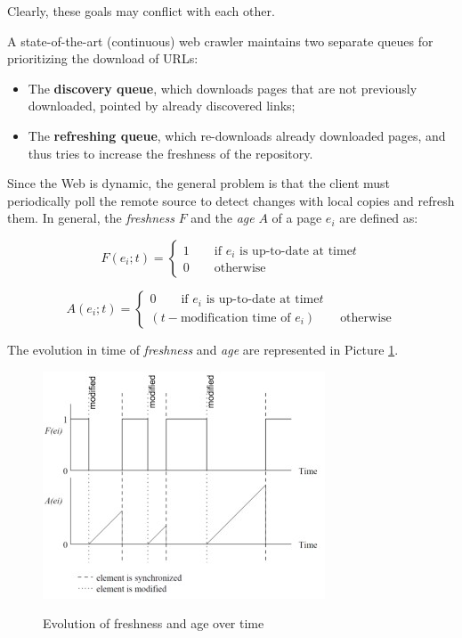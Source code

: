 Clearly, these goals may conflict with each other. 

A state-of-the-art (continuous) web crawler maintains two separate queues for prioritizing the download of URLs:

\begin{itemize}
    \item The \textbf{discovery queue}, which downloads pages that are not previously downloaded, pointed by already discovered links;
    \item The \textbf{refreshing queue}, which re-downloads already downloaded pages, and thus tries to increase the freshness of the repository.
\end{itemize}

Since the Web is dynamic, the general problem is that the client must periodically poll the remote source to detect changes with local copies and refresh them. In general, the \textit{freshness} $F$ and the \textit{age} $A$ of a page $e_i$ are defined as:

$$
F(e_i; t) = \begin{cases}
    1 \qquad \text{if } e_i \text{ is up-to-date at time} t \\
    0 \qquad \text{otherwise}
\end{cases}
$$

$$
A(e_i; t) = \begin{cases}
    0 \qquad \text{if } e_i \text{ is up-to-date at time} t \\
    (t - \text{modification time of } e_i) \qquad \text{otherwise}
\end{cases}
$$

The evolution in time of \textit{freshness} and \textit{age} are represented in Picture \ref{freshness and age}.

\begin{figure}[h!]
		\centering
		\includegraphics[scale = 1.8]{img/fr and age.jpg}
		\label{freshness and age}
        \caption{Evolution of freshness and age over time}
\end{figure}


